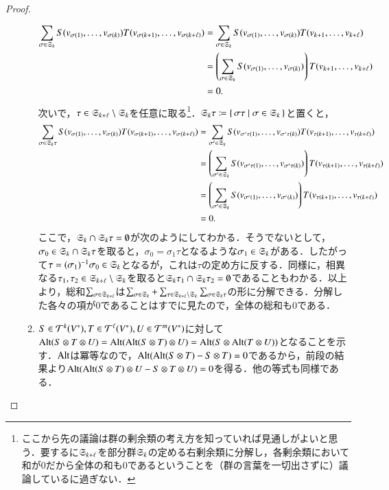 \begin{proof}
\begin{enumerate}
\begin{enumerate}
\begin{align}
\sum_{\sigma \in \mathfrak{S}_k} S(v_{\sigma(1)}, \dots, v_{\sigma(k)})T(v_{\sigma(k+1)}, \dots, v_{\sigma(k + \ell)}) &= \sum_{\sigma \in \mathfrak{S}_k} S(v_{\sigma(1)}, \dots, v_{\sigma(k)})T(v_{k+1}, \dots, v_{k + \ell}) \\
&= \left(  \sum_{\sigma \in \mathfrak{S}_k} S(v_{\sigma(1)}, \dots, v_{\sigma(k)}) \right) T(v_{k+1}, \dots, v_{k + \ell}) \\
&=0.
\end{align}
次いで，$\tau \in \mathfrak{S}_{k+\ell} \setminus \mathfrak{S}_k$を任意に取る\footnote{ここから先の議論は群の剰余類の考え方を知っていれば見通しがよいと思う．要するに$\mathfrak{S}_{k+\ell}$を部分群$\mathfrak{S}_k$の定める右剰余類に分解し，各剰余類において和が0だから全体の和も0であるということを（群の言葉を一切出さずに）議論しているに過ぎない．}．$\mathfrak{S}_k \tau \coloneqq \set{\sigma \tau | \sigma \in \mathfrak{S}_k}$と置くと，
\begin{align}
\sum_{\sigma \in \mathfrak{S}_k \tau} S(v_{\sigma(1)}, \dots, v_{\sigma(k)})T(v_{\sigma(k+1)}, \dots, v_{\sigma(k + \ell)}) &= \sum_{\sigma' \in \mathfrak{S}_k} S(v_{\sigma'\tau(1)}, \dots, v_{\sigma'\tau(k)})T(v_{\tau(k+1)}, \dots, v_{\tau(k + \ell)}) \\
&= \left(\sum_{\sigma' \in \mathfrak{S}_k} S(v_{\sigma'\tau(1)}, \dots, v_{\sigma'\tau(k)}) \right) T(v_{\tau(k+1)}, \dots, v_{\tau(k + \ell)}) \\
&= \left(\sum_{\sigma' \in \mathfrak{S}_k} S(v_{\sigma'(1)}, \dots, v_{\sigma'(k)}) \right) T(v_{\tau(k+1)}, \dots, v_{\tau(k + \ell)}) \\
&=0.
\end{align}ここで，$\mathfrak{S}_k \cap \mathfrak{S}_k \tau = \emptyset$が次のようにしてわかる．そうでないとして，$\sigma_0 \in \mathfrak{S}_k \cap \mathfrak{S}_k \tau$を取ると，$\sigma_0 = \sigma_1 \tau$となるような$\sigma_1 \in \mathfrak{S}_k$がある．したがって$\tau = (\sigma_1)^{-1}\sigma_0 \in \mathfrak{S}_k$となるが，これは$\tau$の定め方に反する．同様に，相異なる$\tau_1, \tau_2 \in \mathfrak{S}_{k+\ell} \setminus \mathfrak{S}_k$を取ると$\mathfrak{S}_k \tau_1 \cap \mathfrak{S}_k \tau_2 = \emptyset$であることもわかる．以上より，総和$\sum_{\sigma \in \mathfrak{S}_{k+\ell}}$は$\sum_{\sigma \in \mathfrak{S}_k} + \sum_{\tau \in \mathfrak{S}_{k+\ell} \setminus \mathfrak{S}_k} \sum_{\sigma \in \mathfrak{S}_k \tau}$の形に分解できる．分解した各々の項が0であることはすでに見たので，全体の総和も0である．
\item $S \in \mathcal{T}^k(V^*), T \in \mathcal{T}^\ell(V^*), U \in \mathcal{T}^m(V^*)$に対して$\operatorname{Alt}(S \otimes T \otimes U) = \operatorname{Alt}(\operatorname{Alt}(S \otimes T) \otimes U) = \operatorname{Alt}(S \otimes \operatorname{Alt}(T \otimes U))$となることを示す．$\operatorname{Alt}$は冪等なので，$\operatorname{Alt}(\operatorname{Alt}(S \otimes T) - S \otimes T)=0$であるから，前段の結果より$\operatorname{Alt}(\operatorname{Alt}(S \otimes T) \otimes U - S \otimes T \otimes U)=0$を得る．他の等式も同様である．

\end{enumerate}
\end{enumerate}
\end{proof}
